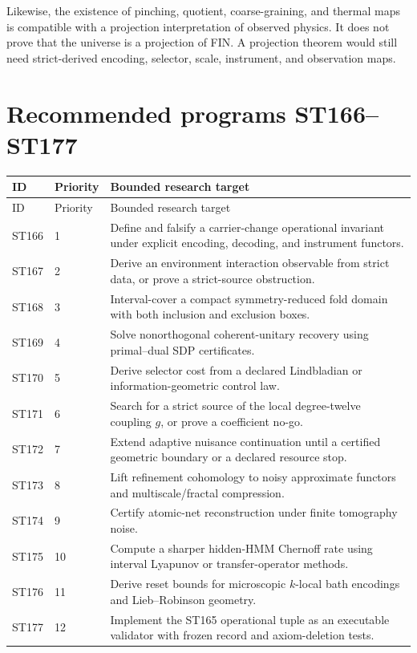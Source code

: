 \documentclass[11pt,a4paper]{article}
\begin{document}
Likewise, the existence of pinching, quotient, coarse-graining, and thermal maps is compatible with a projection interpretation of observed physics. It does not prove that the universe is a projection of FIN. A projection theorem would still need strict-derived encoding, selector, scale, instrument, and observation maps.

\section{Recommended programs ST166--ST177}

\begin{longtable}{@{}p{}p{}p{}@{}}
\toprule ID & Priority & Bounded research target\\\midrule\endfirsthead
\toprule ID & Priority & Bounded research target\\\midrule\endhead
ST166 & 1 & Define and falsify a carrier-change operational invariant under explicit encoding, decoding, and instrument functors.\\
ST167 & 2 & Derive an environment interaction observable from strict data, or prove a strict-source obstruction.\\
ST168 & 3 & Interval-cover a compact symmetry-reduced fold domain with both inclusion and exclusion boxes.\\
ST169 & 4 & Solve nonorthogonal coherent-unitary recovery using primal--dual SDP certificates.\\
ST170 & 5 & Derive selector cost from a declared Lindbladian or information-geometric control law.\\
ST171 & 6 & Search for a strict source of the local degree-twelve coupling $g$, or prove a coefficient no-go.\\
ST172 & 7 & Extend adaptive nuisance continuation until a certified geometric boundary or a declared resource stop.\\
ST173 & 8 & Lift refinement cohomology to noisy approximate functors and multiscale/fractal compression.\\
ST174 & 9 & Certify atomic-net reconstruction under finite tomography noise.\\
ST175 & 10 & Compute a sharper hidden-HMM Chernoff rate using interval Lyapunov or transfer-operator methods.\\
ST176 & 11 & Derive reset bounds for microscopic $k$-local bath encodings and Lieb--Robinson geometry.\\
ST177 & 12 & Implement the ST165 operational tuple as an executable validator with frozen record and axiom-deletion tests.\\
\bottomrule
\end{longtable}
\end{document}
